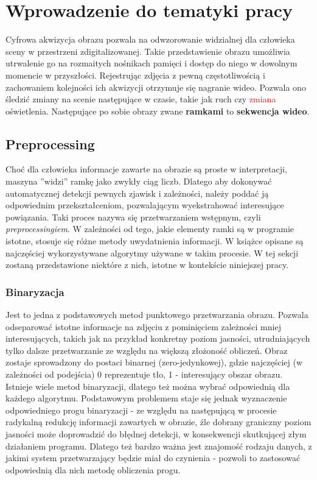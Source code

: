 \chapter{Wprowadzenie do tematyki pracy}
\label{cha:tematykaPracy}
Cyfrowa akwizycja obrazu pozwala na odwzorowanie widzialnej dla człowieka sceny w przestrzeni zdigitalizowanej. Takie przedstawienie obrazu umożliwia utrwalenie go na rozmaitych nośnikach pamięci i dostęp do niego w dowolnym momencie w przyszłości. Rejestrując zdjęcia z pewną częstotliwością i zachowaniem kolejności ich akwizycji otrzymuje się nagranie wideo. Pozwala ono śledzić zmiany na scenie następujące w czasie, takie jak ruch czy \textcolor{red}{zmiana} oświetlenia. Następujące po sobie obrazy zwane \textbf{ramkami} to \textbf{sekwencja wideo}.
\section{Preprocessing}
Choć dla człowieka informacje zawarte na obrazie są proste w interpretacji, maszyna ''widzi'' ramkę jako zwykły ciąg liczb. Dlatego aby dokonywać automatycznej detekcji pewnych zjawisk i zależności, należy poddać ją odpowiednim przekształceniom, pozwalającym wyekstrahować interesujące powiązania. Taki proces nazywa się przetwarzaniem wstępnym, czyli \textit{preprocessingiem}. W zależności od tego, jakie elementy ramki są w programie istotne, stosuje się różne metody uwydatnienia informacji. W książce \cite{i1823330731} opisane są najczęściej wykorzystywane algorytmy używane w takim procesie. W tej sekcji zostaną przedstawione niektóre z nich, istotne w kontekście niniejszej pracy.
\subsection{Binaryzacja}
Jest to jedna z podstawowych metod punktowego przetwarzania obrazu.  Pozwala odseparować istotne informacje na zdjęciu z pominięciem zależności mniej interesujących, takich jak na przykład konkretny poziom jasności, utrudniających tylko dalsze przetwarzanie ze względu na większą złożoność obliczeń. Obraz zostaje sprowadzony do postaci binarnej (zero-jedynkowej), gdzie najczęściej (w zależności od podejścia) 0 reprezentuje tło, 1 - interesujący obszar obrazu. \\
Istnieje wiele metod binaryzacji, dlatego też można wybrać odpowiednią dla każdego algorytmu. Podstawowym problemem staje się jednak wyznaczenie odpowiedniego progu binaryzacji - ze względu na następującą w procesie radykalną redukcję informacji zawartych w obrazie, źle dobrany graniczny poziom jasności może doprowadzić do błędnej detekcji, w konsekwencji skutkującej złym działaniem programu. Dlatego też bardzo ważna jest znajomość rodzaju danych, z jakimi system przetwarzający będzie miał do czynienia - pozwoli to zastosować odpowiednią dla nich metodę obliczenia progu.

